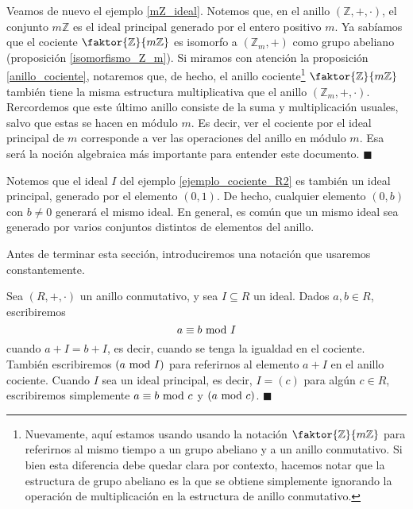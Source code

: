 \begin{example} \label{modulo_n}
Veamos de nuevo el ejemplo \ref{mZ_ideal}. Notemos que, en el anillo $(\mathbb{Z}, +, \cdot)$, el conjunto $m\mathbb{Z}$ es el ideal principal generado por el entero positivo $m$. Ya sabíamos que el cociente $\faktor{\mathbb{Z}}{m\mathbb{Z}}$ es isomorfo a $(\mathbb{Z}_m, +)$ como grupo abeliano (proposición \ref{isomorfismo_Z_m}). Si miramos con atención la proposición \ref{anillo_cociente}, notaremos que, de hecho, el anillo cociente\footnote{Nuevamente, aquí estamos usando usando la notación $\faktor{\mathbb{Z}}{m\mathbb{Z}}$ para referirnos al mismo tiempo a un grupo abeliano y a un anillo conmutativo. Si bien esta diferencia debe quedar clara por contexto, hacemos notar que la estructura de grupo abeliano es la que se obtiene simplemente ignorando la operación de multiplicación en la estructura de anillo conmutativo.} $\faktor{\mathbb{Z}}{m\mathbb{Z}}$ también tiene la misma estructura multiplicativa que el anillo $(\mathbb{Z}_m, +, \cdot)$. Rercordemos que este último anillo consiste de la suma y multiplicación usuales, salvo que estas se hacen en módulo $m$. Es decir, ver el cociente por el ideal principal de $m$ corresponde a ver las operaciones del anillo en módulo $m$. Esa será la noción algebraica más importante para entender este documento. \hfill$\blacksquare$
\end{example}

Notemos que el ideal $I$ del ejemplo \ref{ejemplo_cociente_R2} es también un ideal principal, generado por el elemento $(0, 1)$. De hecho, cualquier elemento $(0, b)$ con $b \neq 0$ generará el mismo ideal. En general, es común que un mismo ideal sea generado por varios conjuntos distintos de elementos del anillo.

Antes de terminar esta sección, introduciremos una notación que usaremos constantemente.

\begin{definition} \label{notacion_modulo}
Sea $(R, +, \cdot)$ un anillo conmutativo, y sea $I \subseteq R$ un ideal. Dados $a, b \in R$, escribiremos
$$a \equiv b \!\! \mod I$$
cuando $a + I = b + I$, es decir, cuando se tenga la igualdad en el cociente. También escribiremos $(a \!\! \mod I)$ para referirnos al elemento $a+I$ en el anillo cociente. Cuando $I$ sea un ideal principal, es decir, $I = (c)$ para algún $c \in R$, escribiremos simplemente $a \equiv b \!\! \mod c$ y $(a \!\! \mod c)$.
\hfill$\blacksquare$
\end{definition}

